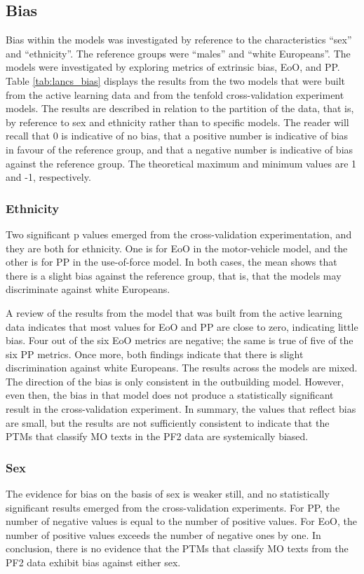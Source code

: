 \subsection{Bias} Bias within the models was investigated by reference to the characteristics “sex” and “ethnicity”. The reference groups were “males” and “white Europeans”. The models were investigated by exploring metrics of extrinsic bias, EoO, and PP. Table \ref{tab:lancs_bias}  displays the results from the two models that were built from the active learning data and from the tenfold cross-validation experiment models. The results are described in relation to the partition of the data, that is, by reference to sex and ethnicity rather than to specific models. The reader will recall that 0 is indicative of no bias, that a positive number is indicative of bias in favour of the reference group, and that a negative number is indicative of bias against the reference group. The theoretical maximum and minimum values are 1 and -1, respectively.

\subsubsection{Ethnicity} Two significant p values emerged from the cross-validation experimentation, and they are both for ethnicity. One is for EoO in the motor-vehicle model, and the other is for PP in the use-of-force model. In both cases, the mean shows that there is a slight bias against the reference group, that is, that the models may discriminate against white Europeans.

A review of the results from the model that was built from the active learning data indicates that most values for EoO and PP are close to zero, indicating little bias. Four out of the six EoO metrics are negative; the same is true of five of the six PP metrics. Once more, both findings indicate that there is slight discrimination against white Europeans. The results across the models are mixed. The direction of the bias is only consistent in the outbuilding model. However, even then, the bias in that model does not produce a statistically significant result in the cross-validation experiment. In summary, the values that reflect bias are small, but the results are not sufficiently consistent to indicate that the PTMs that classify MO texts in the PF2 data are systemically biased.


\subsubsection{Sex} The evidence for bias on the basis of sex is weaker still, and no statistically significant results emerged from the cross-validation experiments. For PP, the number of negative values is equal to the number of positive values. For EoO, the number of positive values exceeds the number of negative ones by one. In conclusion, there is no evidence that the PTMs that classify MO texts from the PF2 data exhibit bias against either sex.

